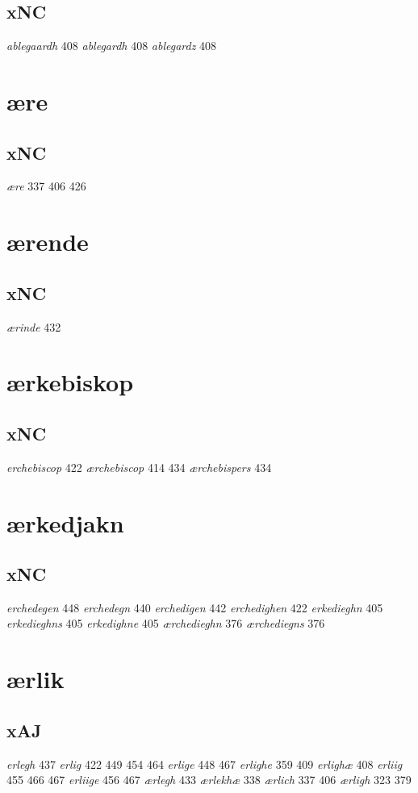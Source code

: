 \documentclass[a4paper,twocolumn]{article}
\begin{document}
\subsection{xNC}
\label{sec:orga206b22}
\emph{ablegaardh} 408 \emph{ablegardh} 408 \emph{ablegardz} 408 
\section{ære}
\label{sec:org7f9f54d}
\subsection{xNC}
\label{sec:org3fe0eee}
\emph{ære} 337 406 426 
\section{ærende}
\label{sec:orgd6f57fd}
\subsection{xNC}
\label{sec:org72c9b78}
\emph{ærinde} 432 
\section{ærkebiskop}
\label{sec:org8e34f07}
\subsection{xNC}
\label{sec:org7b28897}
\emph{erchebiscop} 422 \emph{ærchebiscop} 414 434 \emph{ærchebispers} 434 
\section{ærkedjakn}
\label{sec:orgbe958d1}
\subsection{xNC}
\label{sec:org514a4cc}
\emph{erchedegen} 448 \emph{erchedegn} 440 \emph{erchedigen} 442 \emph{erchedighen} 422 \emph{erkedieghn} 405 \emph{erkedieghns} 405 \emph{erkedighne} 405 \emph{ærchedieghn} 376 \emph{ærchediegns} 376 
\section{ærlik}
\label{sec:org93cc941}
\subsection{xAJ}
\label{sec:org021f93e}
\emph{erlegh} 437 \emph{erlig} 422 449 454 464 \emph{erlige} 448 467 \emph{erlighe} 359 409 \emph{erlighæ} 408 \emph{erliig} 455 466 467 \emph{erliige} 456 467 \emph{ærlegh} 433 \emph{ærlekhæ} 338 \emph{ærlich} 337 406 \emph{ærligh} 323 379 
\end{document}
